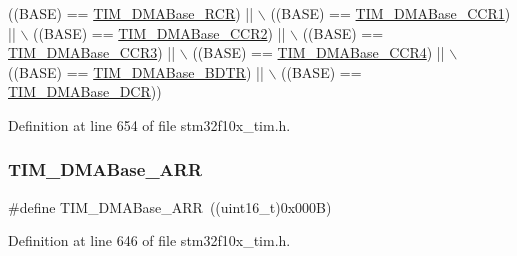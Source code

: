 \begin{DoxyCode}
                               ((BASE) == \hyperlink{group___t_i_m___d_m_a___base__address_ga97f9edceee5c99b32aaa2c6daf849b7d}{TIM\_DMABase\_RCR}) || \(\backslash\)
                               ((BASE) == \hyperlink{group___t_i_m___d_m_a___base__address_ga235a47fa47fd19594a111e6e48c0d5a2}{TIM\_DMABase\_CCR1}) || \(\backslash\)
                               ((BASE) == \hyperlink{group___t_i_m___d_m_a___base__address_ga0e2150dcd3afe31ecb793aa471b3b972}{TIM\_DMABase\_CCR2}) || \(\backslash\)
                               ((BASE) == \hyperlink{group___t_i_m___d_m_a___base__address_ga590c90085bd2b206b941dff2731fed74}{TIM\_DMABase\_CCR3}) || \(\backslash\)
                               ((BASE) == \hyperlink{group___t_i_m___d_m_a___base__address_ga5e84a16e7d8ea369a3a55bb6fe1f2171}{TIM\_DMABase\_CCR4}) || \(\backslash\)
                               ((BASE) == \hyperlink{group___t_i_m___d_m_a___base__address_gaaff22bbf3091c47783c1c68b648c8605}{TIM\_DMABase\_BDTR}) || \(\backslash\)
                               ((BASE) == \hyperlink{group___t_i_m___d_m_a___base__address_ga59e2206e4e03b9d55c9fb5a24e29b01c}{TIM\_DMABase\_DCR}))
\end{DoxyCode}


Definition at line 654 of file stm32f10x\+\_\+tim.\+h.

\mbox{\label{group___t_i_m___d_m_a___base__address_gaab8a66f70e59b5916b4bba344746d652}} 
\subsubsection{\texorpdfstring{T\+I\+M\+\_\+\+D\+M\+A\+Base\+\_\+\+A\+RR}{TIM\_DMABase\_ARR}}
{\footnotesize\ttfamily \#define T\+I\+M\+\_\+\+D\+M\+A\+Base\+\_\+\+A\+RR~((uint16\+\_\+t)0x000\+B)}



Definition at line 646 of file stm32f10x\+\_\+tim.\+h.

\mbox{\label{group___t_i_m___d_m_a___base__address_gaaff22bbf3091c47783c1c68b648c8605}} 
